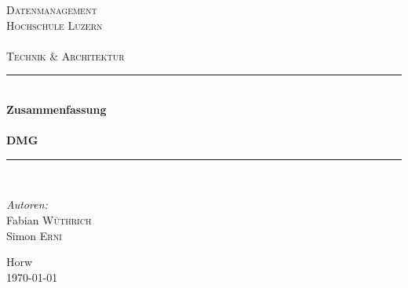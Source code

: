 \begin{titlepage}

\begin{center}

\textsc{\LARGE Datenmanagement}\\[1.5cm]

\textsc{\Large Hochschule Luzern\\
    ~\\
    Technik \& Architektur}\\[0.5cm]

\vfill{}

\newcommand{\HRule}{\rule{\linewidth}{0.5mm}}
\HRule \\[0.4cm]
{   \Huge \bfseries Zusammenfassung\\
        ~\\
        \large DMG}\\[0.4cm]

\HRule \\[1.5cm]

\begin{minipage}{0.4\textwidth}
    \begin{flushleft} \large
        \emph{Autoren:}\\
        Fabian \textsc{Wüthrich}\\
        Simon \textsc{Erni}
    \end{flushleft}
\end{minipage}
\hfill
\begin{minipage}{0.4\textwidth}
    \begin{flushright} \large
    \end{flushright}
\end{minipage}

\vfill{}
\vfill{}
\vfill{}

{\large Horw\\ \today}

\end{center}

\end{titlepage}
